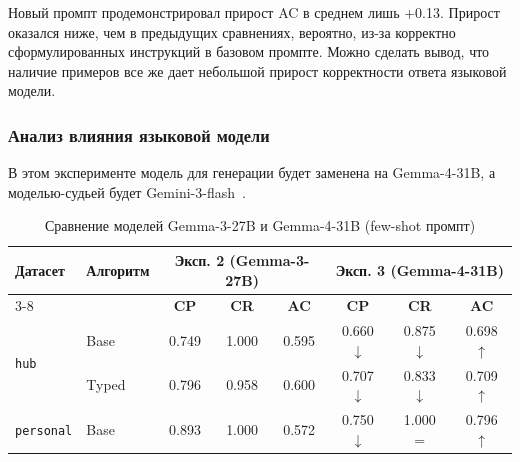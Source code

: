 Новый промпт продемонстрировал прирост AC в среднем лишь +0.13.
Прирост оказался ниже, чем в предыдущих сравнениях, вероятно,
из-за корректно сформулированных инструкций в базовом промпте.
Можно сделать вывод,
что наличие примеров все же дает небольшой прирост корректности ответа языковой модели.

\subsubsection*{Анализ влияния языковой модели}

В этом эксперименте
модель для генерации будет заменена на Gemma-4-31B, а
моделью-судьей будет Gemini-3-flash~\cite{gemini_3_flash}.

\begin{table}[H]
    \caption{Сравнение моделей Gemma-3-27B и Gemma-4-31B (few-shot промпт)}
    \label{tab:model_comparison_2_3}
    \centering
    \begin{tabular}{llccc|ccc}
        \hline
        \multirow{2}{*}{\textbf{Датасет}}   & \multirow{2}{*}{\textbf{Алгоритм}} & \multicolumn{3}{c|}{\textbf{Эксп. 2 (Gemma-3-27B)}} & \multicolumn{3}{c}{\textbf{Эксп. 3 (Gemma-4-31B)}}                                                                            \\
        \cline{3-8}
                                            &                                    & \textbf{CP}                                         & \textbf{CR}                                        & \textbf{AC} & \textbf{CP}        & \textbf{CR}        & \textbf{AC}      \\
        \hline
        \multirow{2}{*}{\texttt{hub}}       & Base                               & 0.749                                               & 1.000                                              & 0.595       & 0.660 $\downarrow$ & 0.875 $\downarrow$ & 0.698 $\uparrow$ \\
                                            & Typed                              & 0.796                                               & 0.958                                              & 0.600       & 0.707 $\downarrow$ & 0.833 $\downarrow$ & 0.709 $\uparrow$ \\
        \hline
        \multirow{2}{*}{\texttt{personal}}  & Base                               & 0.893                                               & 1.000                                              & 0.572       & 0.750 $\downarrow$ & 1.000 $=$          & 0.796 $\uparrow$ \\

\end{tabular}
\end{table}
